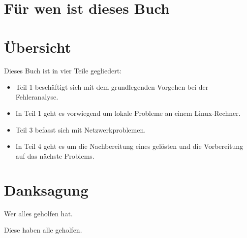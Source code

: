 \section*{Für wen ist dieses Buch}
\label{sec:fuerwen}

\begin{normaltext}
\end{normaltext}

\section*{Übersicht}
\label{sec:ubersicht}

\begin{normaltext}
  Dieses Buch ist in vier Teile gegliedert:
  \begin{itemize}
  \item Teil 1 beschäftigt sich mit dem grundlegenden Vorgehen bei der
    Fehleranalyse.
  \item In Teil 1 geht es vorwiegend um lokale Probleme an einem
    Linux-Rechner.
  \item Teil 3 befasst sich mit Netzwerkproblemen.
  \item In Teil 4 geht es um die Nachbereitung eines gelösten und die
    Vorbereitung auf das nächste Problems.
  \end{itemize}
\end{normaltext}

\section*{Danksagung}
\label{sec:problemstellung}

\begin{abstractsec}
  Wer alles geholfen hat.
\end{abstractsec}
\begin{normaltext}
  Diese haben alle geholfen.
\end{normaltext}

